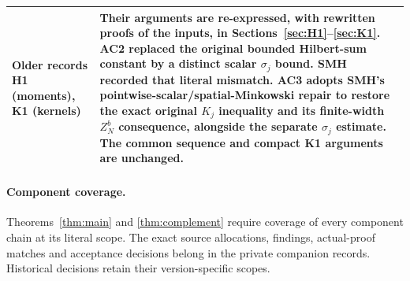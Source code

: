 \documentclass[11pt]{article}
\theoremstyle{plain}
\theoremstyle{definition}
\theoremstyle{remark}
\begin{document}
{\begin{longtable}{@{}p{}p{}@{}}
Older records H1 (moments), K1 (kernels) & Their arguments are re-expressed, with rewritten proofs of the inputs, in Sections~\ref{sec:H1}--\ref{sec:K1}. AC2 replaced the original bounded Hilbert-sum constant by a distinct scalar $\sigma_j$ bound. SMH recorded that literal mismatch. AC3 adopts SMH's pointwise-scalar/spatial-Minkowski repair to restore the exact original $K_j$ inequality and its finite-width $Z_N^b$ consequence, alongside the separate $\sigma_j$ estimate. The common sequence and compact K1 arguments are unchanged.\\
\bottomrule
\end{longtable}}

\paragraph{Component coverage.}
Theorems~\ref{thm:main} and \ref{thm:complement} require coverage of every
component chain at its literal scope. The exact source allocations,
findings, actual-proof matches and acceptance decisions belong in the
private companion records. Historical decisions retain their version-specific
scopes.
\end{document}

